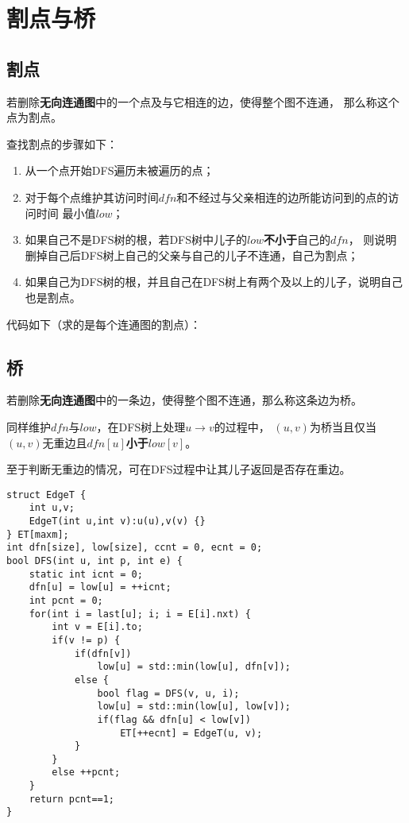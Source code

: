 \section{割点与桥}
\subsection{割点}
若删除{\bfseries 无向连通图}中的一个点及与它相连的边，使得整个图不连通，
那么称这个点为割点。

查找割点的步骤如下：
\begin{enumerate}
    \item 从一个点开始DFS遍历未被遍历的点；
    \item 对于每个点维护其访问时间$dfn$和不经过与父亲相连的边所能访问到的点的访问时间
    最小值$low$；
    \item 如果自己不是DFS树的根，若DFS树中儿子的$low${\bfseries 不小于}自己的$dfn$，
    则说明删掉自己后DFS树上自己的父亲与自己的儿子不连通，自己为割点；
    \item 如果自己为DFS树的根，并且自己在DFS树上有两个及以上的儿子，说明自己也是割点。
\end{enumerate}

代码如下（求的是每个连通图的割点）：


\subsection{桥}
若删除{\bfseries 无向连通图}中的一条边，使得整个图不连通，那么称这条边为桥。

同样维护$dfn$与$low$，在DFS树上处理$u\rightarrow v$的过程中，
$(u,v)$为桥当且仅当$(u,v)$无重边且$dfn[u]${\bfseries 小于}$low[v]$。

至于判断无重边的情况，可在DFS过程中让其儿子返回是否存在重边。

\begin{lstlisting}
struct EdgeT {
    int u,v;
    EdgeT(int u,int v):u(u),v(v) {}
} ET[maxm];
int dfn[size], low[size], ccnt = 0, ecnt = 0;
bool DFS(int u, int p, int e) {
    static int icnt = 0;
    dfn[u] = low[u] = ++icnt;
    int pcnt = 0;
    for(int i = last[u]; i; i = E[i].nxt) {
        int v = E[i].to;
        if(v != p) {
            if(dfn[v])
                low[u] = std::min(low[u], dfn[v]);
            else {
                bool flag = DFS(v, u, i);
                low[u] = std::min(low[u], low[v]);
                if(flag && dfn[u] < low[v])
                    ET[++ecnt] = EdgeT(u, v);
            }
        }
        else ++pcnt;
    }
    return pcnt==1;
}
\end{lstlisting}
